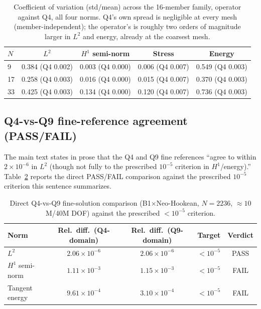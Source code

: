 \documentclass[final,5p,times]{elsarticle}
\begin{document}
\begin{table}[ht]
\centering
\caption{Coefficient of variation (std/mean) across the 16-member family,
  operator against Q4, all four norms. Q4's own spread is negligible at
  every mesh (member-independent); the operator's is roughly two orders
  of magnitude larger in $L^2$ and energy, already at the coarsest mesh.}
\label{tab:c4}
\small
\begin{tabular}{lcccc}
\toprule
$N$ & $L^2$ & $H^1$ semi-norm & Stress & Energy \\
\midrule
9  & 0.384 (Q4 0.002) & 0.003 (Q4 0.000) & 0.006 (Q4 0.007) & 0.549 (Q4 0.003) \\
17 & 0.258 (Q4 0.003) & 0.016 (Q4 0.000) & 0.015 (Q4 0.007) & 0.370 (Q4 0.003) \\
33 & 0.425 (Q4 0.003) & 0.134 (Q4 0.000) & 0.120 (Q4 0.007) & 0.736 (Q4 0.003) \\
\bottomrule
\end{tabular}
\end{table}

\subsection{Q4-vs-Q9 fine-reference agreement (PASS/FAIL)}
The main text states in prose that the Q4 and Q9 fine
references ``agree to within $2\times10^{-6}$ in $L^2$ (though not fully
to the prescribed $10^{-5}$ criterion in $H^1$/energy).'' Table~\ref{tab:c5}
reports the direct PASS/FAIL comparison against the prescribed
$10^{-5}$ criterion this sentence summarizes.

\begin{table}[ht]
\centering
\caption{Direct Q4-vs-Q9 fine-solution comparison (B1$\times$Neo-Hookean,
  $N{=}2236$, $\approx10$M/40M DOF) against the prescribed
  $<10^{-5}$ criterion.}
\label{tab:c5}
\small
\begin{tabular}{lcccc}
\toprule
Norm & Rel.\ diff.\ (Q4-domain) & Rel.\ diff.\ (Q9-domain) & Target & Verdict \\
\midrule
$L^2$            & $2.06\times10^{-6}$ & $2.06\times10^{-6}$ & $<10^{-5}$ & PASS \\
$H^1$ semi-norm  & $1.11\times10^{-3}$ & $1.15\times10^{-3}$ & $<10^{-5}$ & FAIL \\
Tangent energy   & $9.61\times10^{-4}$ & $3.10\times10^{-4}$ & $<10^{-5}$ & FAIL \\
\bottomrule
\end{tabular}
\end{table}
\end{document}
